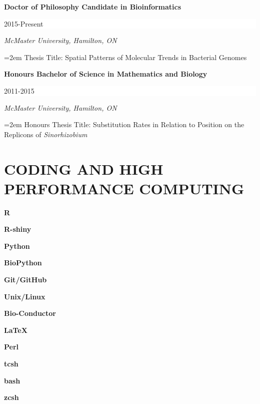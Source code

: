 \documentclass[paper=a4,fontsize=11pt]{scrartcl}	 			%
\newcommand{\sepspace}{\vspace*{1em}}			%
\newcommand{\NewPart}[1]{\section*{\uppercase{#1}}}
\newcommand{\EducationEntry}[4]{
		\noindent \textbf{#1} \hfill 					%
		\colorbox{White}{%
			\parbox{10em}{%
			\hfill\color{Black}#2}} \par				%
		\noindent \textit{#3} \par					%
		\noindent\hangindent=2em\hangafter=0 \small #4 	%
		\normalsize \par}
\newcommand{\codeEntry}[2]{						%
		\noindent \textbf{#1} \hfill 					%
		\colorbox{White}{\color{Black}#2} \par		%
		}
\begin{document}
\EducationEntry{Doctor of Philosophy Candidate in Bioinformatics}{2015-Present}{McMaster University, Hamilton, ON}{%
Thesis Title: Spatial Patterns of Molecular Trends in Bacterial Genomes}
\sepspace

\EducationEntry{Honours Bachelor of Science in Mathematics and Biology}{2011-2015}{McMaster University, Hamilton, ON}{%
	Honours Thesis Title: Substitution Rates in Relation to Position on the Replicons of \textit{Sinorhizobium}}



\NewPart{Coding and High Performance Computing}
\begin{multicols}{3}

\codeEntry{R}{}
\codeEntry{R-shiny}{}
\codeEntry{Python}{}
\codeEntry{BioPython}{}
\codeEntry{Git/GitHub}{}
\codeEntry{Unix/Linux}{}
\codeEntry{Bio-Conductor}{}
\codeEntry{\LaTeX}{}
\codeEntry{Perl}{}
\codeEntry{tcsh}{}
\codeEntry{bash}{}
\codeEntry{zcsh}{}
\end{multicols}
\end{document}

